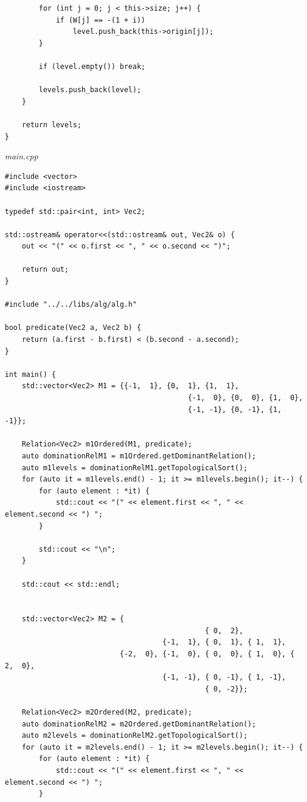 \documentclass[a4paper,14pt]{extarticle}
\begin{document}
\begin{enumerate}[1.]
\begin{verbatim}
        for (int j = 0; j < this->size; j++) {
            if (W[j] == -(1 + i)) 
                level.push_back(this->origin[j]);
        }

        if (level.empty()) break;

        levels.push_back(level);
    }
    
    return levels;
}
					\end{verbatim}
					\textit{main.cpp}
					\begin{verbatim}
#include <vector>
#include <iostream>

typedef std::pair<int, int> Vec2;

std::ostream& operator<<(std::ostream& out, Vec2& o) {
    out << "(" << o.first << ", " << o.second << ")";

    return out;
}

#include "../../libs/alg/alg.h"

bool predicate(Vec2 a, Vec2 b) {
    return (a.first - b.first) < (b.second - a.second);
}

int main() {
    std::vector<Vec2> M1 = {{-1,  1}, {0,  1}, {1,  1},
                                           {-1,  0}, {0,  0}, {1,  0},
                                           {-1, -1}, {0, -1}, {1, -1}};

    Relation<Vec2> m1Ordered(M1, predicate);
    auto dominationRelM1 = m1Ordered.getDominantRelation();
    auto m1levels = dominationRelM1.getTopologicalSort();
    for (auto it = m1levels.end() - 1; it >= m1levels.begin(); it--) {
        for (auto element : *it) {
            std::cout << "(" << element.first << ", " << element.second << ") ";
        }

        std::cout << "\n";
    }

    std::cout << std::endl;


    std::vector<Vec2> M2 = {
                                               { 0,  2},
                                     {-1,  1}, { 0,  1}, { 1,  1},
                           {-2,  0}, {-1,  0}, { 0,  0}, { 1,  0}, { 2,  0},
                                     {-1, -1}, { 0, -1}, { 1, -1},
                                               { 0, -2}};

    Relation<Vec2> m2Ordered(M2, predicate);
    auto dominationRelM2 = m2Ordered.getDominantRelation();
    auto m2levels = dominationRelM2.getTopologicalSort();
    for (auto it = m2levels.end() - 1; it >= m2levels.begin(); it--) {
        for (auto element : *it) {
            std::cout << "(" << element.first << ", " << element.second << ") ";
        }


\end{verbatim}
\end{enumerate}
\end{document}

